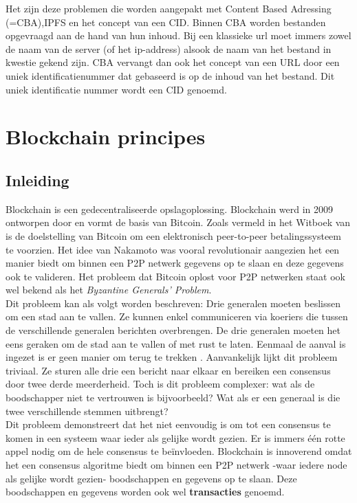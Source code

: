 Het zijn deze problemen die worden aangepakt met Content Based Adressing (=CBA),IPFS en het concept van een CID. Binnen CBA worden bestanden opgevraagd aan de hand van hun inhoud. Bij een klassieke url moet immers zowel de naam van de server (of het ip-address) alsook de naam van het bestand in kwestie gekend zijn. CBA vervangt dan ook het concept van een URL door een uniek identificatienummer dat gebaseerd is op de inhoud van het bestand. Dit uniek identificatie nummer wordt een CID genoemd.\\

\section{Blockchain principes}
\subsection{Inleiding}
Blockchain is een gedecentraliseerde opslagoplossing. Blockchain werd in 2009 ontworpen door \textcite{Satoshi2009} en vormt de basis van Bitcoin. Zoals vermeld in het Witboek van \textcite{Satoshi2009} is de doelstelling van Bitcoin om een elektronisch peer-to-peer betalingssysteem te voorzien. Het idee van Nakamoto was vooral revolutionair aangezien het een manier biedt om binnen een P2P netwerk gegevens op te slaan en deze gegevens ook te valideren. Het probleem dat Bitcoin oplost voor P2P netwerken staat ook wel bekend als het \textit{Byzantine Generals’ Problem}.\\

Dit probleem kan als volgt worden beschreven: Drie generalen moeten beslissen om een stad aan te vallen. Ze kunnen enkel communiceren via koeriers die tussen de verschillende generalen berichten overbrengen. De drie generalen moeten het eens geraken om de stad aan te vallen of met rust te laten. Eenmaal de aanval is ingezet is er geen manier om terug te trekken \autocite{Peter2018}. Aanvankelijk lijkt dit probleem triviaal. Ze sturen alle drie een bericht naar elkaar en bereiken een consensus door twee derde meerderheid. Toch is dit probleem complexer: wat als de boodschapper niet te vertrouwen is bijvoorbeeld? Wat als er een generaal is die twee verschillende stemmen uitbrengt?\\

Dit probleem demonstreert dat het niet eenvoudig is om tot een consensus te komen in een systeem waar ieder als gelijke wordt gezien. Er is immers één rotte appel nodig om de hele consensus te beïnvloeden. Blockchain is innoverend omdat het een consensus algoritme biedt om binnen een P2P netwerk -waar iedere node als gelijke wordt gezien- boodschappen en gegevens op te slaan. Deze boodschappen en gegevens worden ook wel \textbf{transacties} genoemd.\\

